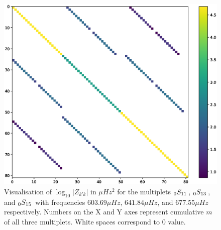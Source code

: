 \begin{figure}[h]
\includegraphics[scale=0.6,center]{Chapter2/figs/coup_mat}
\caption{Visualisation of $\log_{10}|Z_{k'k}|$ in $\mu Hz^2$ for the multiplets $_{0}S_{11}\,$, $_{0}S_{13}\,$, and $_{0}S_{15}\,$ with frequencies $603.69 \mu Hz$, $641.84\mu Hz$, and $677.55 \mu Hz$ respectively. Numbers on the X and Y axes represent cumulative $m$ of all three multiplets. White spaces correspond to $0$ value.}  
\label{fig:coup_mat}
\end{figure}